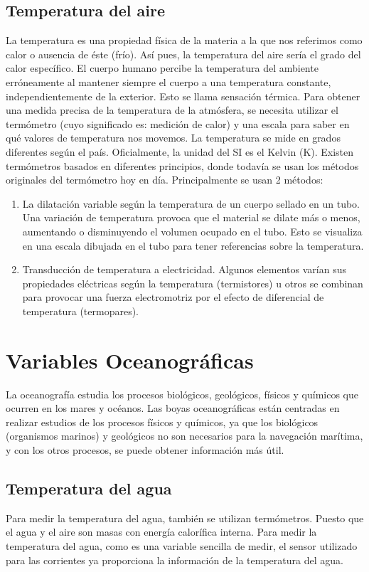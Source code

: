 \documentclass[12pt]{book}
\begin{document}
\subsection{Temperatura del aire}	

La temperatura es una propiedad física de la materia a la que nos referimos
como calor o ausencia de éste (frío). Así pues, la temperatura del aire sería el grado del calor específico.
El cuerpo humano percibe la temperatura del ambiente erróneamente al
mantener siempre el cuerpo a una temperatura constante, independientemente
de la exterior. Esto se llama sensación térmica. Para obtener una medida precisa de la temperatura de la atmósfera, se necesita utilizar el termómetro (cuyo significado es: medición de calor) y una escala para saber en qué valores de temperatura nos movemos. La temperatura se mide en grados diferentes según el país. Oficialmente, la unidad del SI es el Kelvin (K). Existen termómetros basados en diferentes principios, donde todavía se usan los métodos originales del termómetro hoy en día.
Principalmente se usan 2 métodos:
\begin{enumerate}
	\item La dilatación variable según la temperatura de un cuerpo sellado en un tubo. Una variación de temperatura provoca que el material se dilate más o menos, aumentando o disminuyendo el volumen ocupado en el tubo. Esto se visualiza en una escala dibujada en el tubo para tener referencias sobre la 	temperatura.
	\item Transducción de temperatura a electricidad. Algunos elementos varían sus 	propiedades eléctricas según la temperatura (termistores) u otros se combinan para provocar una fuerza electromotriz por el efecto de diferencial 	de temperatura (termopares).
\end{enumerate}


\section{Variables Oceanográficas}
La oceanografía estudia los procesos biológicos, geológicos, físicos y químicos que ocurren en los mares y océanos. Las boyas oceanográficas están centradas en realizar estudios de los procesos físicos y químicos, ya que los biológicos (organismos marinos) y geológicos no son necesarios para la navegación marítima, y con los otros procesos, se puede obtener información más útil.

\subsection{Temperatura del agua}
Para medir la temperatura del agua, también se utilizan termómetros. Puesto que el agua y el aire son masas con energía calorífica interna.
Para medir la temperatura del agua, como es una variable sencilla de medir, el sensor utilizado para las corrientes ya proporciona la información de la temperatura del agua.
\end{document}
